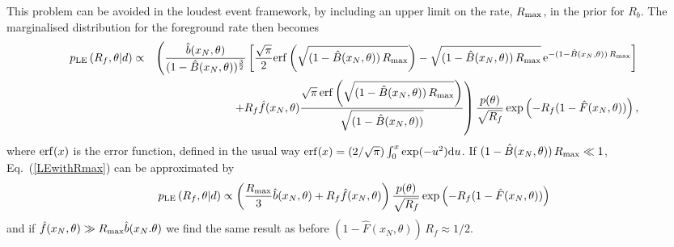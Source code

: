 \documentclass[aps,prd]{revtex4-1}
\begin{document}
This problem can be avoided in the loudest event framework, by including an upper limit on the rate, $R_{\rm max}$, in the prior for $R_b$. The marginalised distribution for the foreground rate then becomes
\begin{eqnarray}
p_{\rm LE}\left( R_f, \theta | d \right) &\propto& \left( \frac{\hat{b}(x_N,\theta)}{(1-\hat{B}(x_N,\theta))^{\frac{3}{2}}} \left[\frac{\sqrt{\pi}}{2}{\rm erf}\left(\sqrt{(1-\hat{B}(x_N,\theta))\,R_{\rm max}}\right) - \sqrt{(1-\hat{B}(x_N,\theta))\,R_{\rm max}} \, {\rm e}^{-(1-\hat{B}(x_N,\theta)) \, R_{\rm max}}\right] \right. \nonumber \\
&& \left.+ R_f \hat{f}(x_N,\theta)\frac{\sqrt{\pi}\,{\rm erf}\left(\sqrt{(1-\hat{B}(x_N,\theta))\,R_{\rm max}}\right)}{\sqrt{(1-\hat{B}(x_N,\theta))}}\right)\frac{p(\theta)}{\sqrt{R_f}} \exp\left(-R_f(1-\hat{F}(x_N,\theta))\right) \label{LEwithRmax},
\end{eqnarray}
where ${\rm erf}(x)$ is the error function, defined in the usual way ${\rm erf}(x) = (2/\sqrt{\pi}) \int_0^x \exp(-u^2){\rm d}u$. If $(1-\hat{B}(x_N,\theta)) \, R_{\rm max} \ll 1$, Eq.~(\ref{LEwithRmax}) can be approximated by
\begin{equation}
p_{\rm LE}\left( R_f, \theta | d \right) \propto \left( \frac{R_{\rm max}}{3} \hat{b}(x_N,\theta) + R_f \hat{f}(x_N,\theta)\right)\frac{p(\theta)}{\sqrt{R_f}} \exp\left(-R_f(1-\hat{F}(x_N,\theta))\right)
\end{equation}
and if $\hat{f}(x_N,\theta) \gg R_{\rm max} \hat{b}(x_N.\theta)$ we find the same result as before $(1- \hat{F}(x_N,\theta))\,R_f \approx 1/2$.
\end{document}
